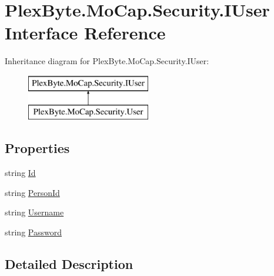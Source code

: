 \hypertarget{interface_plex_byte_1_1_mo_cap_1_1_security_1_1_i_user}{}\section{Plex\+Byte.\+Mo\+Cap.\+Security.\+I\+User Interface Reference}
\label{interface_plex_byte_1_1_mo_cap_1_1_security_1_1_i_user}
Inheritance diagram for Plex\+Byte.\+Mo\+Cap.\+Security.\+I\+User\+:\begin{figure}[H]
\begin{center}
\leavevmode
\includegraphics[height=2.000000cm]{interface_plex_byte_1_1_mo_cap_1_1_security_1_1_i_user}
\end{center}
\end{figure}
\subsection*{Properties}
\begin{DoxyCompactItemize}
\item 
string \hyperlink{interface_plex_byte_1_1_mo_cap_1_1_security_1_1_i_user_ab9deb17662dc2e4af4c794388fd1ef96}{Id}
\item 
string \hyperlink{interface_plex_byte_1_1_mo_cap_1_1_security_1_1_i_user_a626a3fa1b5447931df4a99b12236d4d0}{Person\+Id}
\item 
string \hyperlink{interface_plex_byte_1_1_mo_cap_1_1_security_1_1_i_user_a1e8c48f8a1f3fee58333fd586064e3fb}{Username}
\item 
string \hyperlink{interface_plex_byte_1_1_mo_cap_1_1_security_1_1_i_user_aa2130f9b3edc6b7f08f40787486c841f}{Password}
\end{DoxyCompactItemize}


\subsection{Detailed Description}


